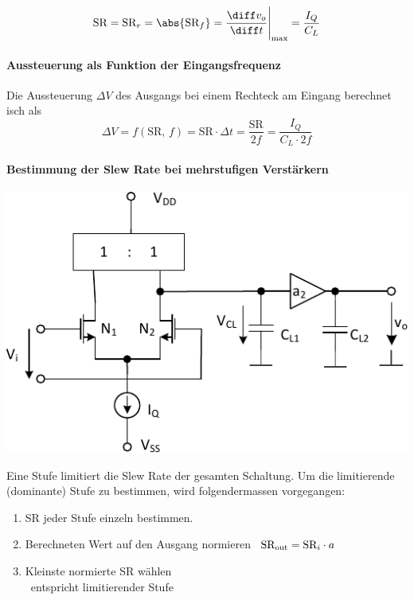 \[
    \text{SR} = \text{SR}_r = \abs{\text{SR}_f} = \frac{\diff v_o}{\diff t} \Bigg|_{\rm max} = \frac{I_Q}{C_L}
\]
\paragraph{Aussteuerung als Funktion der Eingangsfrequenz}
Die Aussteuerung $\Delta V$ des Ausgangs bei einem Rechteck am Eingang berechnet isch als
\[
    \Delta V = f(\mathrm{SR}, \, f) = \text{SR} \cdot \Delta t = \frac{\text{SR}}{2 f} = \frac{I_Q}{C_L \cdot 2 f}
\]


\paragraph{Bestimmung der Slew Rate bei mehrstufigen Verstärkern}

\begin{minipage}[t]{0.46\columnwidth}
    \includegraphics[width=\columnwidth, align=t]{images/09_slew_rate.pdf}
\end{minipage}
\hfill
\begin{minipage}[t]{0.5\columnwidth}
    Eine Stufe limitiert die Slew Rate der gesamten Schaltung. 
    Um die limitierende (dominante) Stufe zu bestimmen, wird folgendermassen vorgegangen:

    \smallskip

    \begin{enumerate}
        \item SR jeder Stufe einzeln bestimmen.
        \item Berechneten Wert auf den Ausgang normieren \textrightarrow\ $\text{SR}_{\rm out} = \text{SR}_i \cdot a$
        \item Kleinste normierte SR wählen \\
            \textrightarrow\ entspricht limitierender Stufe
    \end{enumerate}
\end{minipage}


